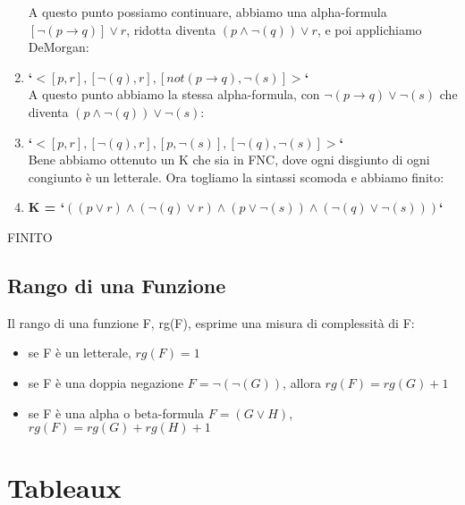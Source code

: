 \documentclass[11pt]{article}
\begin{document}
\begin{enumerate}
A questo punto possiamo continuare, abbiamo una alpha-formula $[\lnot(p \rightarrow q)] \lor r$, ridotta diventa $(p \land \lnot(q)) \lor r$, e poi applichiamo DeMorgan:\\
\item \textbf{`$<[p,r],[\lnot(q),r],[not(p \rightarrow q),\lnot(s)]>$`}\\
A questo punto abbiamo la stessa alpha-formula, con $\lnot(p \rightarrow q) \lor \lnot(s)$ che diventa $(p \land \lnot(q)) \lor \lnot(s)$:\\
\item \textbf{`$<[p,r],[\lnot(q),r],[p,\lnot(s)],[\lnot(q),\lnot(s)]>$`}\\
Bene abbiamo ottenuto un K che sia in FNC, dove ogni disgiunto di ogni congiunto è un letterale. Ora togliamo la sintassi scomoda e abbiamo finito:\\
\item \textbf{K = `$((p \lor r) \land (\lnot(q) \lor r) \land (p \lor \lnot(s)) \land (\lnot(q) \lor \lnot(s)))$`}\\
\end{enumerate}
FINITO
\subsection{Rango di una Funzione}
Il rango di una funzione F, rg(F), esprime una misura di complessità di F:
\begin{itemize}
    \item se F è un letterale, $rg(F) = 1$
    \item se F è una doppia negazione $F = \lnot(\lnot(G))$, allora $rg(F) = rg(G) + 1$
    \item se F è una alpha o beta-formula $F = (G \lor H)$, $rg(F) = rg(G) + rg(H) + 1$
\end{itemize}

\section{Tableaux}
\end{document}
